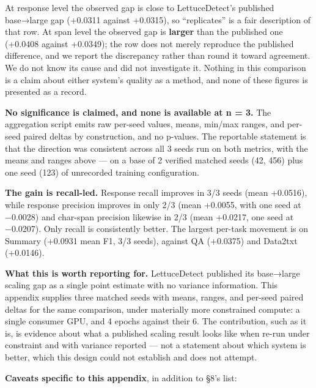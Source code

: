 \documentclass[11pt]{article}
\newcounter{none}
\begin{document}
At response level the observed gap is close to LettuceDetect's published base→large gap
(+0.0311 against +0.0315), so ``replicates'' is a fair description of that row. At span level
the observed gap is \textbf{larger} than the published one (+0.0408 against +0.0349); the row
does not merely reproduce the published difference, and we report the discrepancy rather
than round it toward agreement. We do not know its cause and did not investigate it. Nothing
in this comparison is a claim about either system's quality as a method, and none of these
figures is presented as a record.

\textbf{No significance is claimed, and none is available at n = 3.} The aggregation script emits
raw per-seed values, means, min/max ranges, and per-seed paired deltas by construction, and
no p-values. The reportable statement is that the direction was consistent across all 3
seeds run on both metrics, with the means and ranges above --- on a base of 2 verified
matched seeds (42, 456) plus one seed (123) of unrecorded training configuration.

\textbf{The gain is recall-led.} Response recall improves in 3/3 seeds (mean +0.0516), while
response precision improves in only 2/3 (mean +0.0055, with one seed at −0.0028) and
char-span precision likewise in 2/3 (mean +0.0217, one seed at −0.0207). Only recall is
consistently better. The largest per-task movement is on Summary (+0.0931 mean F1, 3/3
seeds), against QA (+0.0375) and Data2txt (+0.0146).

\textbf{What this is worth reporting for.} LettuceDetect published its base→large scaling gap as
a single point estimate with no variance information. This appendix supplies three matched
seeds with means, ranges, and per-seed paired deltas for the same comparison, under
materially more constrained compute: a single consumer GPU, and 4 epochs against their 6.
The contribution, such as it is, is evidence about what a published scaling result looks
like when re-run under constraint and with variance reported --- not a statement about which
system is better, which this design could not establish and does not attempt.

\textbf{Caveats specific to this appendix}, in addition to §8's list:
\end{document}
